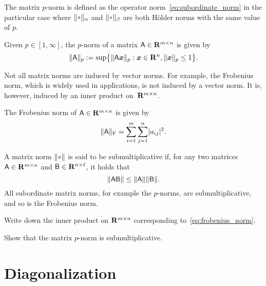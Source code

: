 The matrix $p$-norm is defined as the operator norm~\eqref{eq:subordinate_norm} in the particular case
where $\norm{\placeholder}_{\alpha}$ and $\norm{\placeholder}_{\beta}$ are both H\"older norms with the same value of $p$.
\begin{definition}
Given $p \in [1, \infty]$,
the $p$-norm of a matrix $\mathsf A \in \mathbf R^{m\times n}$ is given by
\begin{equation}
    \label{eq:matrix_p_norm}
    \lVert\mathsf A\rVert_{p} := \sup \bigl\{ \lVert\mathsf A \mathbf{\boldsymbol{x}}\rVert_{p} : \mathbf{\boldsymbol{x}} \in \mathbf R^n, \lVert\mathbf{\boldsymbol{x}}\rVert_{p} \leq 1 \bigr\}.
\end{equation}
\end{definition}
Not all matrix norms are induced by vector norms.
For example, the Frobenius norm,
which is widely used in applications,
is not induced by a vector norm.
It is, however, induced by an inner product on~$\mathbf R^{m \times n}$.
\begin{definition}
    The Frobenius norm of $\mathsf A \in \mathbf R^{m\times n}$ is given by
    \begin{equation}
        \label{eq:frobenius_norm}
        \lVert\mathsf A\rVert_{\rm F} = \sum_{i=1}^{m} \sum_{j=1}^{n} \lvert a_{ij}\rvert^2.
    \end{equation}
\end{definition}

A matrix norm $\norm{\placeholder}$ is said to be submultiplicative if,
for any two matrices $\mathsf A \in \mathbf R^{m \times n}$ and $\mathsf B \in \mathbf R^{n \times \ell}$,
it holds that
\[
    \lVert\mathsf A \mathsf B\rVert \leq \lVert\mathsf A\rVert \lVert\mathsf B\rVert.
\]
All subordinate matrix norms,
for example the $p$-norms, are submultiplicative,
and so is the Frobenius norm.

\begin{exercise}
    Write down the inner product on $\mathbf R^{m \times n}$ corresponding to~\eqref{eq:frobenius_norm}.
\end{exercise}
\begin{exercise}
    Show that the matrix $p$-norm is submultiplicative.
\end{exercise}

\section{Diagonalization}%
\label{sec:diagonalization}


